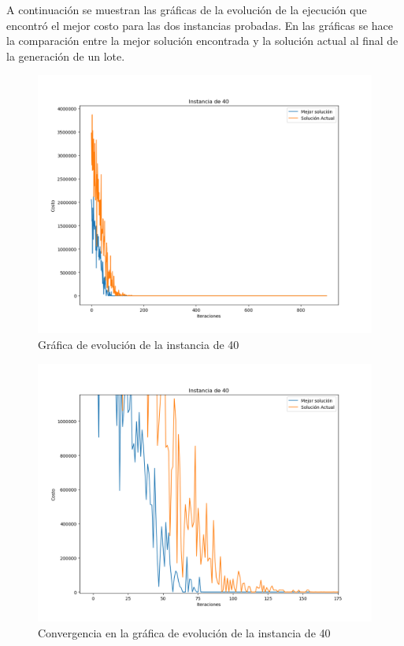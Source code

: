 \documentclass[12pt]{article}
\begin{document}
	
	A continuación se muestran las gráficas de la evolución de la ejecución que encontró 
	el mejor costo para las dos instancias probadas.
	En las gráficas se hace la comparación entre la mejor solución encontrada y la
	solución actual al final de la generación de un lote.
	
	\begin{figure}[H]
		\centering
		\caption{Gráfica de evolución de la instancia de 40}
		\includegraphics[scale=0.6,width=12cm]{I40_1.png}
	\end{figure}
	\begin{figure}[H]
		\centering
		\caption{Convergencia en la gráfica de evolución de la instancia de 40}
		\includegraphics[scale=0.6,width=12cm]{I40_2.png}
	\end{figure}
\end{document}
